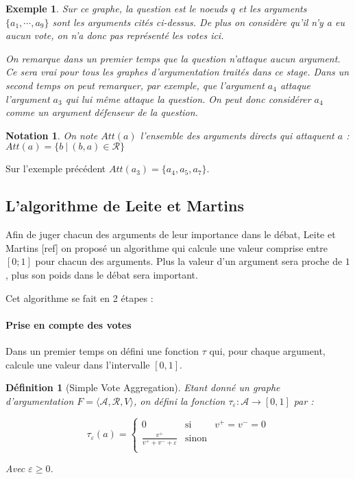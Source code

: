 \documentclass[11pt]{article}
\theoremstyle{defi}
\newtheorem{definition}{Définition}[section]
\theoremstyle{not}
\newtheorem{notation}{Notation}[section]
\theoremstyle{prob}
\newtheorem{example}{Exemple}[section]
\begin{document}
\begin{example}
      Sur ce graphe, la question est le noeuds $q$ et les arguments $\{a_1, \cdots, a_9\}$ sont les arguments cités ci-dessus.
      De plus on considère qu'il n'y a eu aucun vote, on n'a donc pas représenté les votes ici.

      On remarque dans un premier temps que la question n'attaque aucun argument.
      Ce sera vrai pour tous les graphes d'argumentation traités dans ce stage.
      Dans un second temps on peut remarquer, par exemple, que l'argument $a_4$ attaque l'argument $a_3$ qui lui même attaque la question.
      On peut donc considérer $a_4$ comme un argument défenseur de la question.

    \end{example}

    \begin{notation}
      On note $Att(a)$ l'ensemble des arguments directs qui attaquent $a$ :
      $Att(a) = \{b\ |\ (b, a)\in \mathcal{R}\}$
    \end{notation}

    Sur l'exemple précédent $Att(a_3) = \{a_4, a_5, a_7\}$.

    \subsection{L'algorithme de Leite et Martins}
      Afin de juger chacun des arguments de leur importance dans le débat, Leite et Martins [ref] on proposé un algorithme qui calcule une valeur comprise entre $[0; 1]$ pour chacun des arguments. Plus la valeur d'un argument sera proche de $1$, plus son poids dans le débat sera important.

      Cet algorithme se fait en 2 étapes :

      \paragraph{Prise en compte des votes}
      Dans un premier temps on défini une fonction $\tau$ qui, pour chaque argument, calcule une valeur dans l'intervalle $[0, 1]$.

        \begin{definition}[Simple Vote Aggregation]
          Etant donné un graphe d'argumentation $F = \langle \mathcal{A}, \mathcal{R}, V \rangle$, on défini la fonction $\tau_\varepsilon : \mathcal{A} \rightarrow [0, 1]$ par :

          $$\tau_\varepsilon(a) = \left\{
            \begin{array}{lll}
              0 & \mbox{si } & v^+ = v^- = 0\\
              \frac{v^+}{v^+ + v^- + \varepsilon} & \mbox{sinon} & \\
            \end{array}\right.$$

          Avec $\varepsilon \geq 0$.
        \end{definition}
\end{document}
